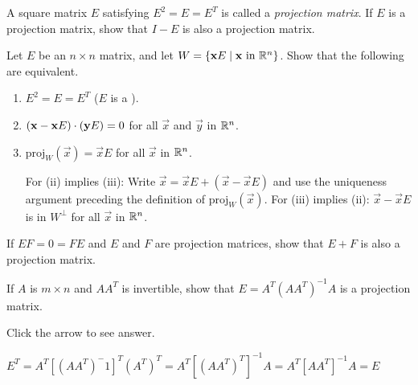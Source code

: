 \documentclass{ximera}
\begin{document}
\begin{problem}\label{prob:8_1_17.2}
A square matrix $E$ satisfying $E^2=E=E^T$ is called a \emph{projection matrix}.  If $E$ is a projection matrix, show that $I - E$ is also a projection matrix.
\end{problem}


\begin{problem}\label{prob:8_1_17.1}
Let $E$ be an $n \times n$ matrix, and let $W = \{\mathbf{x} E \mid \mathbf{x} \mbox{ in } \mathbb{R}^n\}$. Show that the following are equivalent.


\begin{enumerate}
\item $E^{2} = E = E^{T}$ ($E$ is a ).

\item $(\mathbf{x} - \mathbf{x}E) \cdot (\mathbf{y}E) = 0$ for all $\vec{x}$ and $\vec{y}$ in $\mathbb{R}^n$.

\item $\mbox{proj}_W(\vec{x}) = \vec{x}E$ for all $\vec{x}$ in $\mathbb{R}^n$.
\begin{hint}
For (ii) implies (iii): Write $\vec{x} = \vec{x}E + (\vec{x} - \vec{x}E)$ and use the uniqueness argument preceding the definition of $\mbox{proj}_W(\vec{x})$. For (iii) implies (ii): $\vec{x} - \vec{x}E$ is in $W^\perp$ for all $\vec{x}$ in $\mathbb{R}^n$.
\end{hint}
\end{enumerate}
\end{problem}



\begin{problem}\label{prob:8_1_17.3}
If $EF = 0 = FE$ and $E$ and $F$ are projection matrices, show that $E + F$ is also a projection matrix.

\end{problem}

\begin{problem}\label{prob:8_1_17.4}
If $A$ is $m \times n$ and $AA^{T}$ is invertible, show that $E = A^{T}(AA^{T})^{-1}A$ is a projection matrix.

Click the arrow to see answer.

\begin{expandable}{}{}
    $E^T = A^T[(AA^T)^-1]^T(A^T)^T  = A^T[(AA^T)^T]^{-1}A = A^T[AA^T]^{-1}A = E$
\end{expandable}

\end{problem}
\end{document}

